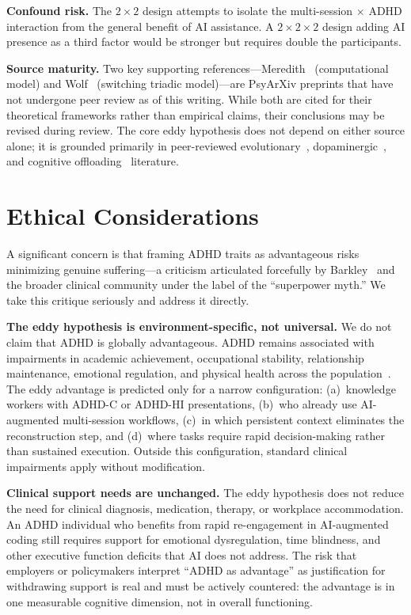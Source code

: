 \documentclass[sigconf,nonacm]{acmart}
\begin{document}
\textbf{Confound risk.} The $2 \times 2$ design attempts to isolate the multi-session $\times$ ADHD interaction from the general benefit of AI assistance. A $2 \times 2 \times 2$ design adding AI presence as a third factor would be stronger but requires double the participants.

\textbf{Source maturity.} Two key supporting references---Meredith~\cite{meredith2025} (computational model) and Wolf~\cite{wolf2025} (switching triadic model)---are PsyArXiv preprints that have not undergone peer review as of this writing. While both are cited for their theoretical frameworks rather than empirical claims, their conclusions may be revised during review. The core eddy hypothesis does not depend on either source alone; it is grounded primarily in peer-reviewed evolutionary~\cite{eisenberg2008, barack2024}, dopaminergic~\cite{grace2001, badgaiyan2015}, and cognitive offloading~\cite{risko2016} literature.

\section{Ethical Considerations}
\label{sec:ethics}

A significant concern is that framing ADHD traits as advantageous risks minimizing genuine suffering---a criticism articulated forcefully by Barkley~\cite{barkley1997} and the broader clinical community under the label of the ``superpower myth.'' We take this critique seriously and address it directly.

\textbf{The eddy hypothesis is environment-specific, not universal.} We do not claim that ADHD is globally advantageous. ADHD remains associated with impairments in academic achievement, occupational stability, relationship maintenance, emotional regulation, and physical health across the population~\cite{cortese2025}. The eddy advantage is predicted only for a narrow configuration: (a)~knowledge workers with ADHD-C or ADHD-HI presentations, (b)~who already use AI-augmented multi-session workflows, (c)~in which persistent context eliminates the reconstruction step, and (d)~where tasks require rapid decision-making rather than sustained execution. Outside this configuration, standard clinical impairments apply without modification.

\textbf{Clinical support needs are unchanged.} The eddy hypothesis does not reduce the need for clinical diagnosis, medication, therapy, or workplace accommodation. An ADHD individual who benefits from rapid re-engagement in AI-augmented coding still requires support for emotional dysregulation, time blindness, and other executive function deficits that AI does not address. The risk that employers or policymakers interpret ``ADHD as advantage'' as justification for withdrawing support is real and must be actively countered: the advantage is in one measurable cognitive dimension, not in overall functioning.
\end{document}
